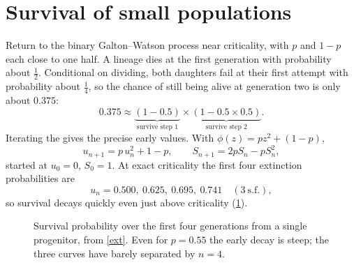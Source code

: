 \section{Survival of small populations}
\label{sec:small}

Return to the binary Galton--Watson process near criticality, with \(p\) and \(1-p\) each close to one half. A lineage dies at the first generation with probability about \(\tfrac12\). Conditional on dividing, both daughters fail at their first attempt with probability about \(\tfrac14\), so the chance of still being alive at generation two is only about \(0.375\):
\begin{equation*}
0.375 \approx \underbrace{(1-0.5)}_{\text{survive step 1}}\times\underbrace{(1-0.5\times0.5)}_{\text{survive step 2}} .
\end{equation*}
Iterating the \pgf{} gives the precise early values. With \(\phi(z)=pz^2+(1-p)\),
\begin{equation}
\label{ext}
u_{n+1} = p\,u_n^2 + 1-p ,
\qquad
S_{n+1} = 2pS_n - pS_n^2 ,
\end{equation}
started at \(u_0=0\), \(S_0=1\). At exact criticality the first four extinction probabilities are
\begin{equation*}
u_n = 0.500,\ 0.625,\ 0.695,\ 0.741\quad(3\ \text{s.f.}),
\end{equation*}
so survival decays quickly even just above criticality (\cref{fig:earlySn}).

\begin{figure}[ht]
\centering
\caption{Survival probability over the first four generations from a single progenitor, from \cref{ext}. Even for \(p=0.55\) the early decay is steep; the three curves have barely separated by \(n=4\).}
\label{fig:earlySn}
\end{figure}


